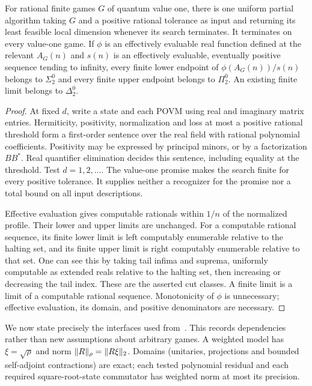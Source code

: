 \begin{proposition}\label{prop:necessity}
For rational finite games $G$ of quantum value one, there is one uniform partial algorithm taking $G$ and a positive rational tolerance as input and returning its least feasible local dimension whenever its search terminates. It terminates on every value-one game. If $\phi$ is an effectively evaluable real function defined at the relevant $A_G(n)$ and $s(n)$ is an effectively evaluable, eventually positive sequence tending to infinity, every finite lower endpoint of $\phi(A_G(n))/s(n)$ belongs to $\Sigma^0_2$ and every finite upper endpoint belongs to $\Pi^0_2$. An existing finite limit belongs to $\Delta^0_2$.
\end{proposition}
\begin{proof}
At fixed $d$, write a state and each POVM using real and imaginary matrix entries. Hermiticity, positivity, normalization and loss at most a positive rational threshold form a first-order sentence over the real field with rational polynomial coefficients. Positivity may be expressed by principal minors, or by a factorization $BB^*$. Real quantifier elimination decides this sentence, including equality at the threshold. Test $d=1,2,\ldots$. The value-one promise makes the search finite for every positive tolerance. It supplies neither a recognizer for the promise nor a total bound on all input descriptions.

Effective evaluation gives computable rationals within $1/n$ of the normalized profile. Their lower and upper limits are unchanged. For a computable rational sequence, its finite lower limit is left computably enumerable relative to the halting set, and its finite upper limit is right computably enumerable relative to that set. One can see this by taking tail infima and suprema, uniformly computable as extended reals relative to the halting set, then increasing or decreasing the tail index. These are the asserted cut classes. A finite limit is a limit of a computable rational sequence. Monotonicity of $\phi$ is unnecessary; effective evaluation, its domain, and positive denominators are necessary.
\end{proof}

We now state precisely the interfaces used from~\cite{UP,Precision}. This records dependencies rather than new assumptions about arbitrary games. A weighted model has $\xi=\sqrt\rho$ and norm $\lVert R\rVert_\rho=\lVert R\xi\rVert_2$. Domains (unitaries, projections and bounded self-adjoint contractions) are exact; each tested polynomial residual and each required square-root-state commutator has weighted norm at most its precision.

